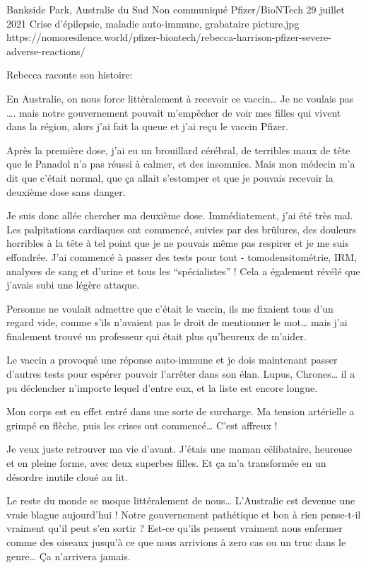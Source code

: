 {Bankside Park, Australie du Sud}
{Non communiqué}
{Pfizer/BioNTech}
{29 juillet 2021}
{Crise d'épilepsie, maladie auto-immune, grabataire}
{picture.jpg}
{https://nomoresilence.world/pfizer-biontech/rebecca-harrison-pfizer-severe-adverse-reactions/}
{

Rebecca raconte son histoire:

En Australie, on nous force littéralement à recevoir ce vaccin… Je ne voulais
pas …. mais notre gouvernement pouvait m'empêcher de voir mes filles qui vivent
dans la région, alors j'ai fait la queue et j'ai reçu le vaccin Pfizer.

Après la première dose, j'ai eu un brouillard cérébral, de terribles maux de
tête que le Panadol n'a pas réussi à calmer, et des insomnies. Mais mon médecin
m'a dit que c'était normal, que ça allait s'estomper et que je pouvais recevoir
la deuxième dose sans danger.

Je suis donc allée chercher ma deuxième dose. Immédiatement, j'ai été très
mal. Les palpitations cardiaques ont commencé, suivies par des brûlures, des
douleurs horribles à la tête à tel point que je ne pouvais même pas respirer et
je me suis effondrée. J'ai commencé à passer des tests pour tout -
tomodensitométrie, IRM, analyses de sang et d'urine et tous les “spécialistes” !
Cela a également révélé que j'avais subi une légère attaque.

Personne ne voulait admettre que c'était le vaccin, ils me fixaient tous d'un
regard vide, comme s'ils n'avaient pas le droit de mentionner le mot… mais j'ai
finalement trouvé un professeur qui était plus qu'heureux de m'aider.

Le vaccin a provoqué une réponse auto-immune et je dois maintenant passer
d'autres tests pour espérer pouvoir l'arrêter dans son élan. Lupus, Chrones… il
a pu déclencher n'importe lequel d'entre eux, et la liste est encore longue.

Mon corps est en effet entré dans une sorte de surcharge. Ma tension artérielle
a grimpé en flèche, puis les crises ont commencé… C'est affreux !

Je veux juste retrouver ma vie d'avant. J'étais une maman célibataire, heureuse
et en pleine forme, avec deux superbes filles. Et ça m'a transformée en un
désordre inutile cloué au lit.

Le reste du monde se moque littéralement de nous… L'Australie est devenue une
vraie blague aujourd'hui ! Notre gouvernement pathétique et bon à rien
pense-t-il vraiment qu'il peut s'en sortir ? Est-ce qu'ils pensent vraiment nous
enfermer comme des oiseaux jusqu'à ce que nous arrivions à zero cas ou un truc
dans le genre… Ça n'arrivera jamais.

}
